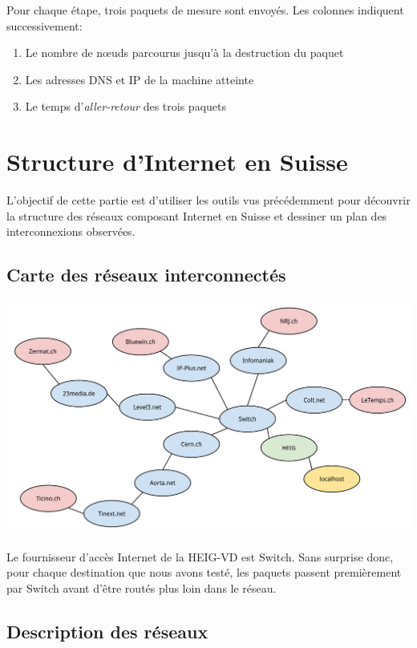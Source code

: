 \documentclass[11pt,a4paper]{article}
\begin{document}
Pour chaque étape, trois paquets de mesure sont envoyés. Les colonnes indiquent successivement:

\begin{enumerate}
	\item Le nombre de nœuds parcourus jusqu'à la destruction du paquet
	\item Les adresses DNS et IP de la machine atteinte
	\item Le temps d'\textit{aller-retour} des trois paquets
\end{enumerate}

\section{Structure d'Internet en Suisse}

L'objectif de cette partie est d'utiliser les outils vus précédemment pour découvrir la structure des réseaux composant Internet en Suisse et dessiner un plan des interconnexions observées.

\subsection{Carte des réseaux interconnectés}

\begin{center}
\includegraphics[width=15cm]{img_suisse}
\end{center}

Le fournisseur d'accès Internet de la HEIG-VD est Switch. Sans surprise donc, pour chaque destination que nous avons testé, les paquets passent premièrement par Switch avant d'être routés plus loin dans le réseau.

\subsection{Description des réseaux}
\end{document}
